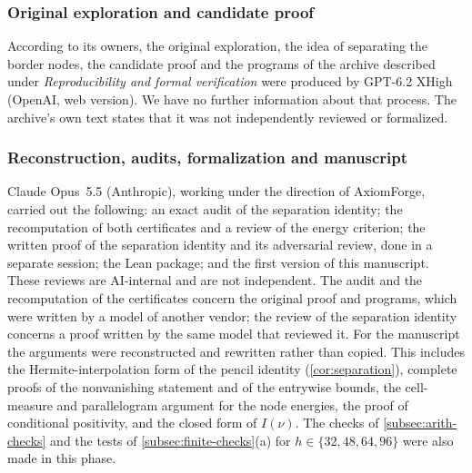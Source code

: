 
\subsubsection*{Original exploration and candidate proof}
According to its owners, the original exploration, the idea of separating the border nodes, the
candidate proof and the programs of the archive described under \emph{Reproducibility and
formal verification} were produced by
GPT-6.2 XHigh (OpenAI, web version). We have no further information about that process. The
archive's own text states that it was not independently reviewed or formalized.

\subsubsection*{Reconstruction, audits, formalization and manuscript}
Claude Opus~5.5 (Anthropic), working under the direction of AxiomForge, carried out the following:
an exact audit of the separation identity; the recomputation of both certificates and a
review of the energy criterion; the written proof of the separation identity and its
adversarial review, done in a separate session; the Lean package; and the first version of this
manuscript. These reviews are AI-internal and are not independent. The audit and the recomputation
of the certificates concern the original proof and programs, which were written by a model of
another vendor; the review of the separation identity concerns a proof written by the same model
that reviewed it. For the manuscript the arguments were
reconstructed and rewritten rather than copied. This includes the Hermite-interpolation form of
the pencil identity (\cref{cor:separation}), complete proofs of the nonvanishing statement and of
the entrywise bounds, the cell-measure and parallelogram argument for the node energies, the
proof of conditional positivity, and the closed form of $I(\nu)$. The checks of
\cref{subsec:arith-checks} and the tests of \cref{subsec:finite-checks}(a) for
$h\in\{32,48,64,96\}$ were also made in this phase.

